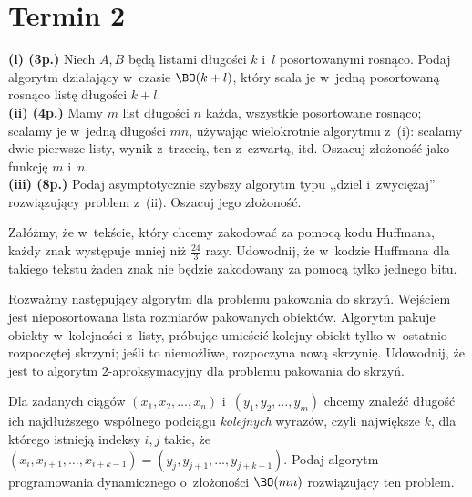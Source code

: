 \section{Termin 2}

\begin{zadanie}
	\textbf{(i) (3p.)} Niech $A,B$ będą listami długości $k$ i~$l$ posortowanymi
	rosnąco. Podaj algorytm działający w~czasie $\BO(k+l)$, który scala je w~jedną
	posortowaną rosnąco listę długości $k+l$.\\
	\textbf{(ii) (4p.)} Mamy $m$ list długości $n$ każda, wszystkie posortowane
	rosnąco; scalamy je w~jedną długości $mn$, używając wielokrotnie algorytmu
	z~(i): scalamy dwie pierwsze listy, wynik z~trzecią, ten z~czwartą, itd.
	Oszacuj złożoność jako funkcję $m$ i~$n$.\\
	\textbf{(iii) (8p.)} Podaj asymptotycznie szybszy algorytm typu ,,dziel
	i~zwyciężaj'' rozwiązujący problem z~(ii). Oszacuj jego złożoność.
\end{zadanie}

\begin{zadanie}
	Załóżmy, że w~tekście, który chcemy zakodować za pomocą kodu Huffmana, każdy
	znak występuje mniej niż $\frac{24}{3}$ razy. Udowodnij, że w~kodzie Huffmana
	dla takiego tekstu żaden znak nie będzie zakodowany za pomocą tylko jednego
	bitu.
\end{zadanie}

\begin{zadanie}
	Rozważmy następujący algorytm dla problemu pakowania do skrzyń. Wejściem jest
	nieposortowana lista rozmiarów pakowanych obiektów. Algorytm pakuje obiekty
	w~kolejności z~listy, próbując umieścić kolejny obiekt tylko w~ostatnio
	rozpoczętej skrzyni; jeśli to niemożliwe, rozpoczyna nową skrzynię. Udowodnij,
	że jest to algorytm $2$-aproksymacyjny dla problemu pakowania do skrzyń.
\end{zadanie}

\begin{zadanie}
	Dla zadanych ciągów $(x_1,x_2,\dots,x_n)$ i~$(y_1,y_2,\dots,y_m)$ chcemy
	znaleźć długość ich najdłuższego wspólnego podciągu \emph{kolejnych} wyrazów,
	czyli największe $k$, dla którego istnieją indeksy $i,j$ takie, że
	$(x_i,x_{i+1},\dots,x_{i+k-1})=(y_j,y_{j+1},\dots,y_{j+k-1})$. Podaj algorytm
	programowania dynamicznego o~złożoności $\BO(mn)$ rozwiązujący ten problem.
\end{zadanie}

